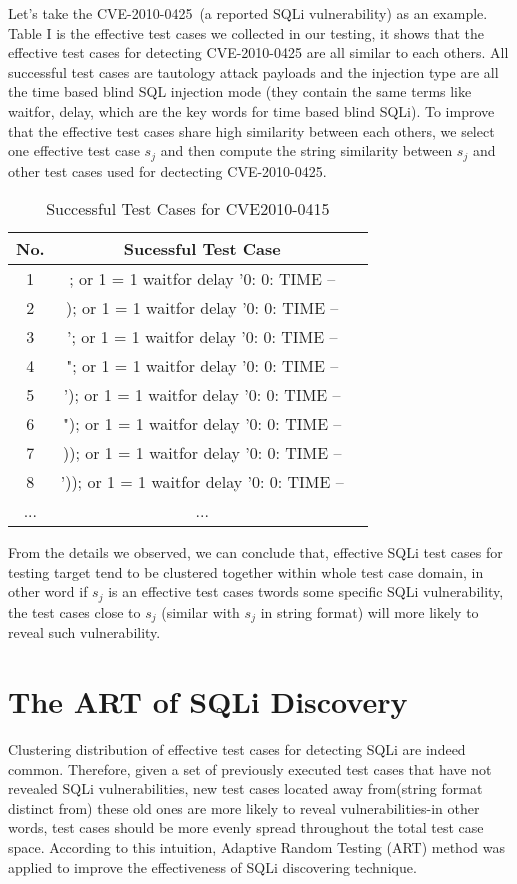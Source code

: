 \documentclass{sig-alternate}
\begin{document}
Let's take the CVE-2010-0425~(a reported SQLi vulnerability) as an example. Table I is the effective test cases we collected in our testing, it shows that the effective test cases for detecting CVE-2010-0425 are all similar to each others. All successful test cases are tautology attack payloads and the injection type are all the time based blind SQL injection mode (they contain the same terms like waitfor, delay, which are the key words for time based blind SQLi). To improve that the effective test cases share high similarity between each others, we select one effective test case $s_{j}$ and then compute the string similarity between $s_{j}$ and other test cases used for dectecting CVE-2010-0425.

\begin{table}
\centering
\caption{Successful Test Cases for CVE2010-0415}
\begin{tabular}{|c|c|l|} \hline
No.&Sucessful Test Case\\ \hline
1 & ; or 1 = 1 waitfor delay '0: 0: TIME --\\ \hline
2 & ); or 1 = 1 waitfor delay '0: 0: TIME --\\ \hline
3 & '; or 1 = 1 waitfor delay '0: 0: TIME --\\ \hline
4 & "; or 1 = 1 waitfor delay '0: 0: TIME --\\ \hline
5 & '); or 1 = 1 waitfor delay '0: 0: TIME --\\ \hline
6 & "); or 1 = 1 waitfor delay '0: 0: TIME --\\ \hline
7 & )); or 1 = 1 waitfor delay '0: 0: TIME --\\ \hline
8 & ')); or 1 = 1 waitfor delay '0: 0: TIME --\\ \hline
... & ...\\
\hline\end{tabular}
\end{table}

From the details we observed, we can conclude that, effective SQLi test cases for testing target tend to be clustered together within whole test case domain, in other word if $s_{j}$ is an effective test cases twords some specific SQLi vulnerability, the test cases close to $s_{j}$ (similar with $s_{j}$ in string format) will more likely to reveal such vulnerability.

\section{The ART of SQLi Discovery}
Clustering distribution of effective test cases for detecting SQLi are indeed common. Therefore, given a set of previously executed
test cases that have not revealed SQLi vulnerabilities, new test cases
located away from(string format distinct from) these old ones are more likely to reveal vulnerabilities-in other words, test cases should be more evenly spread
throughout the total test case space. According to this intuition, Adaptive
Random Testing (ART) method was applied to improve the effectiveness of SQLi discovering technique.
\end{document}
